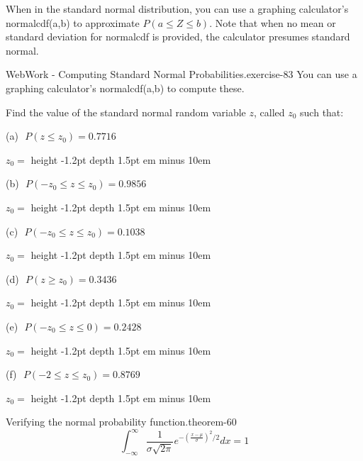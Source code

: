\documentclass[10pt,]{book}
\newcommand{\fillin}[1]{\leavevmode\leaders\vrule height -1.2pt depth 1.5pt \hskip #1em minus #1em \null}
\numberwithin{equation}{section}
\begin{document}
%
\par
\hypertarget{p-1195}{}%
When in the standard normal distribution, you can use a graphing calculator's normalcdf(a,b) to approximate \(P(a \le Z \le b)\).  Note that when no mean or standard deviation for normalcdf is provided, the calculator presumes standard normal.%
\par
\hypertarget{p-1196}{}%
\begin{inlineexercise}{WebWork - Computing Standard Normal Probabilities.}{exercise-83}%
\hypertarget{p-1197}{}%
You can use a graphing calculator's normalcdf(a,b) to compute these.%
\par\medskip
\hypertarget{p-1198}{}%
Find the value of the standard normal random variable \(z\), called \(z_0\) such that:%
\par
\hypertarget{p-1199}{}%
(a) \(\) \(P(z \leq z_0 ) = 0.7716\)%
\par
\hypertarget{p-1200}{}%
\(z_0 =\)  \fillin{10}%
\par
\hypertarget{p-1201}{}%
(b) \(\) \(P(-z_0 \leq z \leq z_0 ) = 0.9856\)%
\par
\hypertarget{p-1202}{}%
\(z_0 =\)  \fillin{10}%
\par
\hypertarget{p-1203}{}%
(c) \(\) \(P(-z_0 \leq z \leq z_0 ) = 0.1038\)%
\par
\hypertarget{p-1204}{}%
\(z_0 =\)  \fillin{10}%
\par
\hypertarget{p-1205}{}%
(d) \(\) \(P(z \geq z_0 ) = 0.3436\)%
\par
\hypertarget{p-1206}{}%
\(z_0 =\)  \fillin{10}%
\par
\hypertarget{p-1207}{}%
(e) \(\) \(P(-z_0 \leq z \leq 0 ) = 0.2428\)%
\par
\hypertarget{p-1208}{}%
\(z_0 =\)  \fillin{10}%
\par
\hypertarget{p-1209}{}%
(f) \(\) \(P(-2 \leq z \leq z_0 ) = 0.8769\)%
\par
\hypertarget{p-1210}{}%
\(z_0 =\)  \fillin{10}%
\end{inlineexercise}
%
\par
\hypertarget{p-1211}{}%
\begin{theorem}{Verifying the normal probability function.}{}{theorem-60}%
\hypertarget{p-1212}{}%
%
\begin{equation*}
\int_{-\infty}^{\infty} \frac{1}{\sigma \sqrt{2 \pi}} e^{ -\left ( \frac{x-\mu}{\sigma} \right ) ^2 / 2} dx = 1
\end{equation*}
%
\end{theorem}
\end{document}
